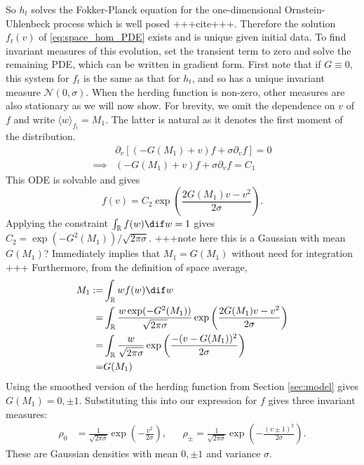 \documentclass[11pt, a4pape draft]{article}
\renewcommand{\R}{\mathbb{R}}
\begin{document}
        So $h_t$ solves the Fokker-Planck equation for the one-dimensional Ornstein-Uhlenbeck process which is well posed +++cite+++. Therefore the solution $f_t(v)$ of \eqref{eq:space_hom_PDE} exists and is unique given initial data. To find invariant measures of this evolution, set the transient term to zero and solve the remaining PDE, which can be written in gradient form. First note that if $G\equiv 0$, this system for $f_t$ is the same as that for $h_t$, and so has a unique invariant measure $\mathcal{N}(0,\sigma)$. When the herding function is non-zero, other measures are also stationary as we will now show. For brevity, we omit the dependence on $v$ of $f$ and write $\langle w \rangle_{f_t} = M_1$. The latter is natural as it denotes the first moment of the distribution.
        \begin{align*}
            &\partial_v\left[(-G(M_1) +v) f + \sigma \partial_v f \right] = 0\\
            \implies& (-G(M_1) +v) f + \sigma \partial_v f = C_1
        \end{align*}
        This ODE is solvable and gives 
        \[
            f(v) = C_2\exp\left(\frac{2G(M_1)v - v^2}{2\sigma} \right). 
        \]
        Applying the constraint $\int_\R f(w)\dif w = 1$ gives $C_2 = \exp(-G^2(M_1))/\sqrt{2\pi\sigma}$. +++note here this is a Gaussian with mean $G(M_1)$? Immediately implies that $M_1 = G(M_1)$ without need for integration +++ Furthermore, from the definition of space average,
        \begin{align*}
            M_1 :=& \int_\R wf(w) \dif w\\ 
            =& \int_\R \frac{w\exp(-G^2(M_1))}{\sqrt{2\pi\sigma}} \exp\left(\frac{2G(M_1)v - v^2}{2\sigma} \right)\\ 
            =& \int_\R \frac{w}{\sqrt{2\pi\sigma}} \exp\left(\frac{ - (v-G(M_1))^2}{2\sigma} \right)\\
            =& G(M_1)
        \end{align*}
        Using the smoothed version of the herding function from Section \ref{sec:model} gives $G(M_1) = 0, \pm 1$. Substituting this into our expression for $f$ gives three invariant measures:
        \begin{align*}
            \rho_0 &= \frac{1}{\sqrt{2\pi\sigma}}\exp\left(-\frac{v^2}{2\sigma} \right), && \rho_{\pm} = \frac{1}{\sqrt{2\pi\sigma}}\exp\left(-\frac{(v\pm 1)^2}{2\sigma}\right).
        \end{align*}
        These are Gaussian densities with mean $0, \pm 1$ and variance $\sigma$.
        
\end{document}
